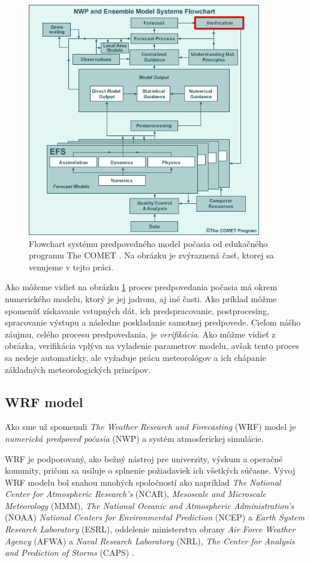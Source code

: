 \begin{figure}
	\centering
	\includegraphics[width = 4in]{ForecastModelDiagramNew}
	\caption{Flowchart systému predpovedného model počasia od edukačného programu The COMET \cite{Comet}. Na obrázku je zvýraznená časť, ktorej sa venujeme v tejto práci.}
	\label{fig:fcstmodel}
\end{figure}

Ako môžeme vidieť na obrázku \ref{fig:fcstmodel} proces predpovedania počasia má okrem numerického modelu, ktorý je jej jadrom, aj iné časti. Ako príklad môžme spomenúť získavanie vstupných dát, ich predspracovanie, postprocesing, spracovanie výstupu a následne poskladanie samotnej predpovede. Cieľom nášho záujmu, celého procesu predpovedania, je \textit{verifikácia}. Ako môžme vidieť z obrázka, verifikácia vplýva na vyladenie parametrov modelu, avšak tento proces sa nedeje automaticky, ale vyžaduje prácu meteorológov a ich chápanie základných meteorologických princípov.


\subsection{WRF model}
\label{subsec:wrf}
Ako sme už spomenuli \textit{The Weather Research and Forecasting} (WRF) model je \textit{numerická predpoveď počasia} (NWP) a systém atmosferickej simulácie.

WRF je podporovaný, ako bežný nástroj pre univerzity, výskum a operačné komunity, pričom sa usiluje o splnenie požiadaviek ich všetkých súčasne.
Vývoj WRF modelu bol snahou mnohých spoločností ako napríklad \textit{The National Center for Atmospheric Research’s} (NCAR), \textit{Mesoscale and Microscale
Meteorology} (MMM), \textit{The National Oceanic and Atmospheric Administration’s} (NOAA) \textit{National Centers for Environmental Prediction} (NCEP) a \textit{Earth System Research Laboratory} (ESRL), oddelenie ministerstva obrany \textit{Air Force Weather Agency} (AFWA) a \textit{Naval
Research Laboratory} (NRL), \textit{The Center for Analysis and Prediction of Storms} (CAPS) \cite{WRF}. 

